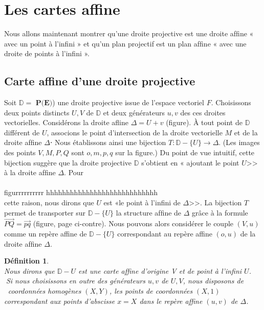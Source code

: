 \documentclass[12pt]{report}
\newtheorem{madef}{Définition}[section]
\begin{document}
\section{Les cartes affine}
Nous allons maintenant montrer qu’une droite projective est une droite afﬁne « avec un point à l’inﬁni » et qu’un plan projectif est un plan afﬁne « avec une droite de points à l’inﬁni ». 
\subsection{Carte affine d'une droite projective }
Soit $\mathbb{D} =\textbf{ P(E)}$) une droite projective issue de l’espace vectoriel $F$. Choisissons 
deux points distincts $U, V$ de $\mathbb{D}$ et deux générateurs $u, v$ des ces droites vectorielles. 
Considérons la droite aﬂine $\Delta = U + v$ (figure). À tout point de $\mathbb{D}$ différent de $U$,  
associons le point d’intersection de la droite vectorielle $M$ et de la droite afﬁne $\Delta$⋅ 
Nous établissons ainsi une bijection $T  :\mathbb{D}-\{U\}\longrightarrow  \Delta$. (Les images des points 
$V, M, P, Q$ sont $o, m, p, q$ sur la figure.) Du point de vue intuitif, cette bijection suggère 
que la droite projective $\mathbb{D}$ s’obtient en « ajoutant le point $U$>>  à la droite afﬁne $\Delta$. Pour 
\\
\\
figurrrrrrrrrr hhhhhhhhhhhhhhhhhhhhhhhhhhhh
\\

cette raison, nous dirons que $U$ est «le point à l’inﬁni de $\Delta$>>. La bijection $T$ permet 
de transporter sur $\mathbb{D}-\{U\}$ la structure afﬁne de $\Delta$ grâce à la formule $\vec{PQ} = \vec{pq}$ 
(figure, page ci-contre). Nous pouvons alors considérer le couple $(V, u)$ comme 
un repère affine de $\mathbb{D}-\{U\}$ correspondant au repère affine $(o, u)$ de la droite afﬁne $\Delta$. 
\begin{madef}\\
	Nous dirons que $\mathbb{D} - {U}$ est une carte affine d’origine V et de point 
	à l'inﬁni $U$. 
	Si nous choisissons en outre des générateurs $u,v$ de $U, V$, nous disposons de 
	coordonnées homogènes $(X, Y)$, les points de coordonnées $(X, 1)$ correspondant aux 
	points d’abscisse $x = X$ dans le repère affine $(u, v)$ de $\Delta$.
\end{madef}
  
\end{document}
